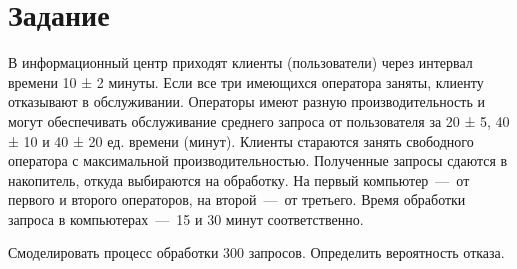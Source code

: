 \chapter{Задание}

В информационный центр приходят клиенты (пользователи) через интервал времени 10 ± 2 минуты. 
Если все три имеющихся оператора заняты, клиенту отказывают в обслуживании.
Операторы имеют разную производительность и могут обеспечивать обслуживание среднего запроса от пользователя за 20 ± 5, 40 ± 10 и 40 ± 20 ед. времени (минут).
Клиенты стараются занять свободного оператора с максимальной производительностью.
Полученные запросы сдаются в накопитель, откуда выбираются на обработку. 
На первый компьютер~---~от первого и второго операторов, на второй~---~от третьего.
Время обработки запроса в компьютерах~---~15 и 30 минут соответственно.

Смоделировать процесс обработки 300 запросов. 
Определить вероятность отказа.